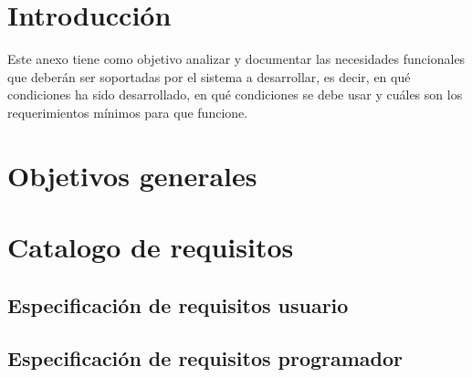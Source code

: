 
\section{Introducción}\label{introduccion-requisitos}

Este anexo tiene como objetivo analizar y documentar las necesidades funcionales que deberán ser soportadas por el sistema a desarrollar, es decir, en qué condiciones ha sido desarrollado, en qué condiciones se debe usar y cuáles son los requerimientos mínimos para que funcione.


\section{Objetivos generales}\label{objetivos-generales}

\section{Catalogo de requisitos}\label{catalogo-requisitos}

\subsection{Especificación de requisitos usuario}\label{espeficiaciones-requisitos-usuario}


\subsection{Especificación de requisitos programador}\label{espeficiaciones-requisitos-programador}


